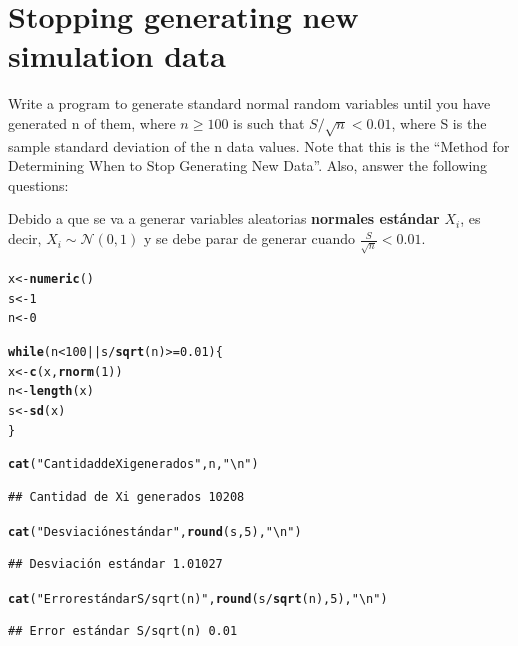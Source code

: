 \documentclass[12pt]{article}\usepackage[]{graphicx}\usepackage[]{xcolor}
\makeatletter
\newcommand{\hlnum}[1]{\textcolor[rgb]{0.686,0.059,0.569}{#1}}%
\newcommand{\hlsng}[1]{\textcolor[rgb]{0.192,0.494,0.8}{#1}}%
\newcommand{\hlopt}[1]{\textcolor[rgb]{0,0,0}{#1}}%
\newcommand{\hldef}[1]{\textcolor[rgb]{0.345,0.345,0.345}{#1}}%
\newcommand{\hlkwa}[1]{\textcolor[rgb]{0.161,0.373,0.58}{\textbf{#1}}}%
\newcommand{\hlkwb}[1]{\textcolor[rgb]{0.69,0.353,0.396}{#1}}%
\newcommand{\hlkwd}[1]{\textcolor[rgb]{0.737,0.353,0.396}{\textbf{#1}}}%
\newenvironment{kframe}{%
 \def\at@end@of@kframe{}%
 \ifinner\ifhmode%
  \def\at@end@of@kframe{\end{minipage}}%
  \begin{minipage}{\columnwidth}%
 \fi\fi%
 \def\FrameCommand##1{\hskip\@totalleftmargin \hskip-\fboxsep
 \colorbox{shadecolor}{##1}\hskip-\fboxsep
     \hskip-\linewidth \hskip-\@totalleftmargin \hskip\columnwidth}%
 \MakeFramed {\advance\hsize-\width
   \@totalleftmargin\z@ \linewidth\hsize
   \@setminipage}}%
 {\par\unskip\endMakeFramed%
 \at@end@of@kframe}
\newenvironment{knitrout}{}{} %
\makeatother
\begin{document}
\section{Stopping generating new simulation data}

Write a program to generate standard normal random variables until you have generated n of them, where $n \geq 100$ is such that $S/\sqrt{n} < 0.01$, where S is the sample standard deviation of the n data values. Note that this is the ``Method for Determining When to Stop Generating New Data''. Also, answer the following questions:



Debido a que se va a generar variables aleatorias \textbf{normales estándar} $X_{i}$, es decir, $X_{i} \sim \mathcal{N}(0, 1)$ y se debe parar de generar cuando $\frac{S}{\sqrt{n}} < 0.01$.

\begin{knitrout}
\color{fgcolor}\begin{kframe}
\begin{alltt}
\hldef{x} \hlkwb{<-} \hlkwd{numeric}\hldef{()}
\hldef{s} \hlkwb{<-} \hlnum{1}
\hldef{n} \hlkwb{<-} \hlnum{0}

\hlkwa{while}\hldef{(n} \hlopt{<} \hlnum{100} \hlopt{||} \hldef{s} \hlopt{/} \hlkwd{sqrt}\hldef{(n)} \hlopt{>=} \hlnum{0.01}\hldef{) \{}
  \hldef{x} \hlkwb{<-} \hlkwd{c}\hldef{(x,} \hlkwd{rnorm}\hldef{(}\hlnum{1}\hldef{))}
  \hldef{n} \hlkwb{<-} \hlkwd{length}\hldef{(x)}
  \hldef{s} \hlkwb{<-} \hlkwd{sd}\hldef{(x)}
\hldef{\}}

\hlkwd{cat}\hldef{(}\hlsng{"Cantidad de Xi generados"}\hldef{, n,} \hlsng{"\textbackslash{}n"}\hldef{)}
\end{alltt}
\begin{verbatim}
## Cantidad de Xi generados 10208
\end{verbatim}
\begin{alltt}
\hlkwd{cat}\hldef{(}\hlsng{"Desviación estándar"}\hldef{,} \hlkwd{round}\hldef{(s,} \hlnum{5}\hldef{),} \hlsng{"\textbackslash{}n"}\hldef{)}
\end{alltt}
\begin{verbatim}
## Desviación estándar 1.01027
\end{verbatim}
\begin{alltt}
\hlkwd{cat}\hldef{(}\hlsng{"Error estándar S/sqrt(n)"}\hldef{,} \hlkwd{round}\hldef{(s}\hlopt{/}\hlkwd{sqrt}\hldef{(n),} \hlnum{5}\hldef{),} \hlsng{"\textbackslash{}n"}\hldef{)}
\end{alltt}
\begin{verbatim}
## Error estándar S/sqrt(n) 0.01
\end{verbatim}
\end{kframe}
\end{knitrout}
\end{document}

